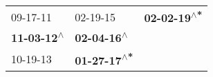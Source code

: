 \begin{supertabular}{lll}
                  09-17-11\textsuperscript{} &                    02-19-15\textsuperscript{} &  \textbf{02-02-19\textsuperscript{$\wedge$*}} \\
 \textbf{11-03-12\textsuperscript{$\wedge$}} &   \textbf{02-04-16\textsuperscript{$\wedge$}} &                                               \\
                  10-19-13\textsuperscript{} &  \textbf{01-27-17\textsuperscript{$\wedge$*}} &                                               \\
\end{supertabular}
